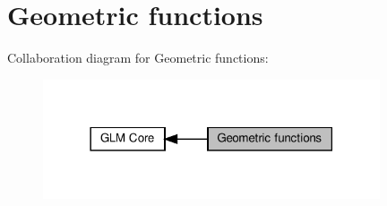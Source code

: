 \hypertarget{group__core__func__geometric}{}\section{Geometric functions}
\label{group__core__func__geometric}
Collaboration diagram for Geometric functions\+:\nopagebreak
\begin{figure}[H]
\begin{center}
\leavevmode
\includegraphics[width=282pt]{group__core__func__geometric}
\end{center}
\end{figure}
